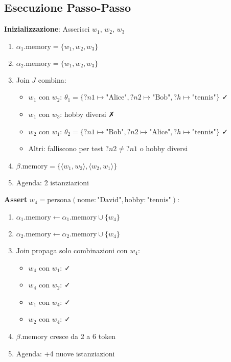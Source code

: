 \subsection{Esecuzione Passo-Passo}

\textbf{Inizializzazione}: Asserisci $w_1$, $w_2$, $w_3$

\begin{enumerate}
\item $\alpha_1.\text{memory} = \{w_1, w_2, w_3\}$
\item $\alpha_2.\text{memory} = \{w_1, w_2, w_3\}$
\item Join $J$ combina:
   \begin{itemize}
   \item $w_1$ con $w_2$: $\theta_1 = \{?n1 \mapsto \text{"Alice"}, ?n2 \mapsto \text{"Bob"}, ?h \mapsto \text{"tennis"}\}$ ✓
   \item $w_1$ con $w_3$: hobby diversi ✗
   \item $w_2$ con $w_1$: $\theta_2 = \{?n1 \mapsto \text{"Bob"}, ?n2 \mapsto \text{"Alice"}, ?h \mapsto \text{"tennis"}\}$ ✓
   \item Altri: falliscono per test $?n2 \neq ?n1$ o hobby diversi
   \end{itemize}
\item $\beta.\text{memory} = \{\langle w_1, w_2 \rangle, \langle w_2, w_1 \rangle\}$
\item Agenda: 2 istanziazioni
\end{enumerate}

\textbf{Assert} $w_4 = \text{persona}(\text{nome}: \text{"David"}, \text{hobby}: \text{"tennis"})$:

\begin{enumerate}
\item $\alpha_1.\text{memory} \gets \alpha_1.\text{memory} \cup \{w_4\}$
\item $\alpha_2.\text{memory} \gets \alpha_2.\text{memory} \cup \{w_4\}$
\item Join propaga solo combinazioni con $w_4$:
   \begin{itemize}
   \item $w_4$ con $w_1$: ✓
   \item $w_4$ con $w_2$: ✓
   \item $w_1$ con $w_4$: ✓
   \item $w_2$ con $w_4$: ✓
   \end{itemize}
\item $\beta.\text{memory}$ cresce da 2 a 6 token
\item Agenda: +4 nuove istanziazioni
\end{enumerate}

